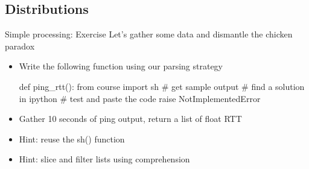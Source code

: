 \subsection{Distributions}
\begin{pyframe}{Simple processing: Exercise}
Let's gather some data and dismantle the chicken paradox
\begin{itemize}
\item Write the following function using our parsing strategy
\begin{pycode}
def ping_rtt():
    from course import sh
    # get sample output
    # find a solution in ipython
    # test and paste the code
    raise NotImplementedError
\end{pycode}
\item Gather 10 seconds of ping output, return a list of float RTT
\item Hint: reuse the sh() function
\item Hint: slice and filter lists using comprehension
\end{itemize}
\end{pyframe}

